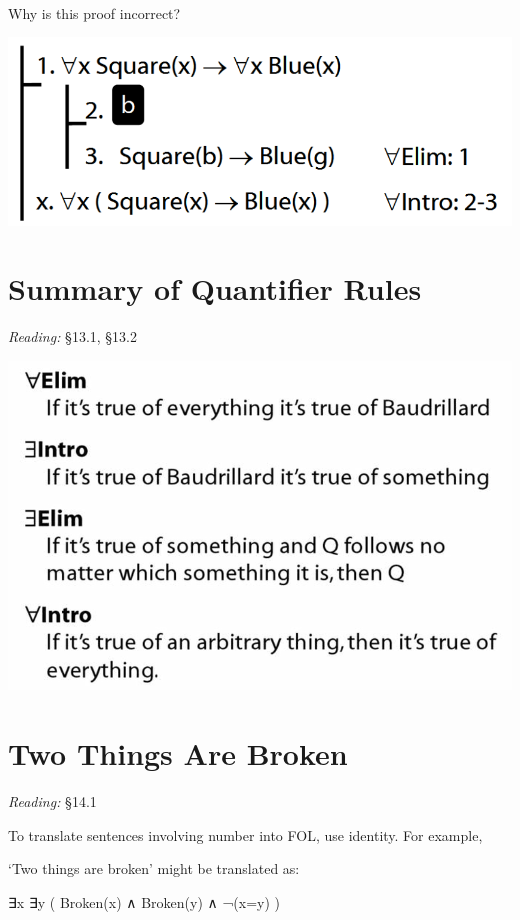 \documentclass[12pt]{extarticle}
\begin{document}
\begin{multicols*}{3}
\begin{minipage}{\columnwidth}
\

\

\
 
Why is this proof incorrect?
 
\begin{center}
\includegraphics[scale=0.3]{img/proof_universal_intro_incorrect.png}
\end{center}
\end{minipage}
 
 \vfill
\columnbreak
\section{Summary of Quantifier Rules}
 
\emph{Reading:} §13.1, §13.2
 
\begin{center}
\includegraphics[scale=0.3]{img/quantifier_rule_summary.png}
\end{center}
 
 
\section{Two Things Are Broken}
 
\emph{Reading:} §14.1
 
To translate sentences involving number into FOL, use identity. For example,
 
`Two things are broken' might be translated as:
 
∃x ∃y ( Broken(x) ∧ Broken(y) ∧ ¬(x=y) )
 
\vfill

 


\end{multicols*}
\end{document}

